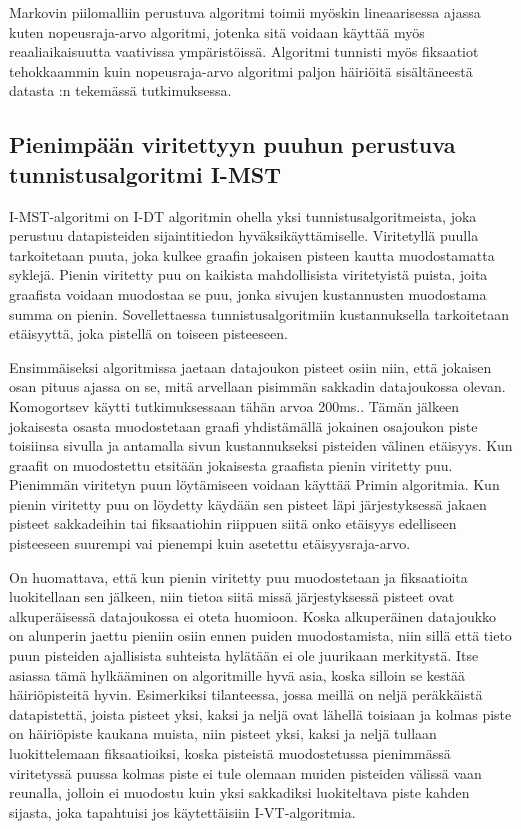 Markovin piilomalliin perustuva algoritmi toimii myöskin lineaarisessa ajassa kuten nopeusraja-arvo algoritmi, jotenka sitä voidaan käyttää myös reaaliaikaisuutta vaativissa ympäristöissä. Algoritmi tunnisti myös fiksaatiot tehokkaammin kuin nopeusraja-arvo algoritmi paljon häiriöitä sisältäneestä datasta \citet[s. 32]{salvucci1999}:n tekemässä tutkimuksessa.

\subsection{Pienimpään viritettyyn puuhun perustuva tunnistusalgoritmi I-MST}
I-MST-algoritmi on I-DT algoritmin ohella yksi tunnistusalgoritmeista, joka perustuu datapisteiden sijaintitiedon hyväksikäyttämiselle. Viritetyllä puulla tarkoitetaan puuta, joka kulkee graafin jokaisen pisteen kautta muodostamatta syklejä. Pienin viritetty puu on kaikista mahdollisista viritetyistä puista, joita graafista voidaan muodostaa se puu, jonka sivujen kustannusten muodostama summa on pienin. Sovellettaessa tunnistusalgoritmiin kustannuksella tarkoitetaan etäisyyttä, joka pistellä on toiseen pisteeseen.

Ensimmäiseksi algoritmissa jaetaan datajoukon pisteet osiin niin, että jokaisen osan pituus ajassa on se, mitä arvellaan pisimmän sakkadin datajoukossa olevan. Komogortsev käytti tutkimuksessaan tähän arvoa 200ms.\citep[s. 3 ]{komogortsev2010}. Tämän jälkeen jokaisesta osasta muodostetaan graafi yhdistämällä jokainen osajoukon piste toisiinsa sivulla ja antamalla sivun kustannukseksi pisteiden välinen etäisyys. Kun graafit on muodostettu etsitään jokaisesta graafista pienin viritetty puu. Pienimmän viritetyn puun löytämiseen voidaan käyttää Primin algoritmia.\citep[s. 75]{salvucci2000} Kun pienin viritetty puu on löydetty käydään sen pisteet läpi järjestyksessä jakaen pisteet sakkadeihin tai fiksaatiohin riippuen siitä onko etäisyys edelliseen pisteeseen suurempi vai pienempi kuin asetettu etäisyysraja-arvo.

On huomattava, että kun pienin viritetty puu muodostetaan ja fiksaatioita luokitellaan sen jälkeen, niin tietoa siitä missä järjestyksessä pisteet ovat alkuperäisessä datajoukossa ei oteta huomioon. Koska alkuperäinen datajoukko on alunperin jaettu pieniin osiin ennen puiden muodostamista, niin sillä että tieto puun pisteiden ajallisista suhteista hylätään ei ole juurikaan merkitystä. Itse asiassa tämä hylkääminen on algoritmille hyvä asia, koska silloin se kestää häiriöpisteitä hyvin. Esimerkiksi tilanteessa, jossa meillä on neljä peräkkäistä datapistettä, joista pisteet yksi, kaksi ja neljä ovat lähellä toisiaan ja kolmas piste on häiriöpiste kaukana muista, niin pisteet yksi, kaksi ja neljä tullaan luokittelemaan fiksaatioiksi, koska pisteistä muodostetussa pienimmässä viritetyssä puussa kolmas piste ei tule olemaan muiden pisteiden välissä vaan reunalla, jolloin ei muodostu kuin yksi sakkadiksi luokiteltava piste kahden sijasta, joka tapahtuisi jos käytettäisiin I-VT-algoritmia.

